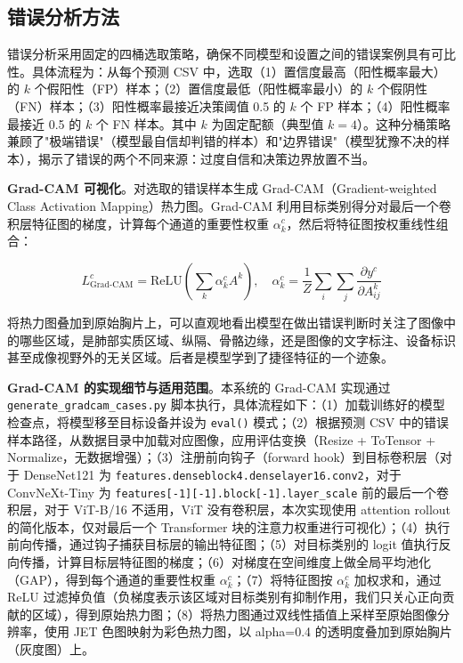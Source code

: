 \documentclass[12pt,a4paper,UTF8,openany]{ctexbook}
\begin{document}
\subsection{错误分析方法}

错误分析采用固定的四桶选取策略，确保不同模型和设置之间的错误案例具有可比性。具体流程为：从每个预测 CSV 中，选取（1）置信度最高（阳性概率最大）的 $k$ 个假阳性（FP）样本；（2）置信度最低（阳性概率最小）的 $k$ 个假阴性（FN）样本；（3）阳性概率最接近决策阈值 0.5 的 $k$ 个 FP 样本；（4）阳性概率最接近 0.5 的 $k$ 个 FN 样本。其中 $k$ 为固定配额（典型值 $k=4$）。这种分桶策略兼顾了"极端错误"（模型最自信却判错的样本）和"边界错误"（模型犹豫不决的样本），揭示了错误的两个不同来源：过度自信和决策边界放置不当。

\textbf{Grad-CAM 可视化}。对选取的错误样本生成 Grad-CAM（Gradient-weighted Class Activation Mapping）热力图。Grad-CAM 利用目标类别得分对最后一个卷积层特征图的梯度，计算每个通道的重要性权重 $\alpha_k^c$，然后将特征图按权重线性组合：

\begin{equation}
L_{\text{Grad-CAM}}^c = \text{ReLU}\left(\sum_k \alpha_k^c A^k\right), \quad
\alpha_k^c = \frac{1}{Z}\sum_i\sum_j \frac{\partial y^c}{\partial A_{ij}^k}
\end{equation}

将热力图叠加到原始胸片上，可以直观地看出模型在做出错误判断时关注了图像中的哪些区域，是肺部实质区域、纵隔、骨骼边缘，还是图像的文字标注、设备标识甚至成像视野外的无关区域。后者是模型学到了捷径特征的一个迹象。

\textbf{Grad-CAM 的实现细节与适用范围}。本系统的 Grad-CAM 实现通过 \texttt{generate\_gradcam\_cases.py} 脚本执行，具体流程如下：（1）加载训练好的模型检查点，将模型移至目标设备并设为 \texttt{eval()} 模式；（2）根据预测 CSV 中的错误样本路径，从数据目录中加载对应图像，应用评估变换（Resize + ToTensor + Normalize，无数据增强）；（3）注册前向钩子（forward hook）到目标卷积层（对于 DenseNet121 为 \texttt{features.denseblock4.denselayer16.conv2}，对于 ConvNeXt-Tiny 为 \texttt{features[-1][-1].block[-1].layer\_scale} 前的最后一个卷积层，对于 ViT-B/16 不适用，ViT 没有卷积层，本次实现使用 attention rollout 的简化版本，仅对最后一个 Transformer 块的注意力权重进行可视化）；（4）执行前向传播，通过钩子捕获目标层的输出特征图；（5）对目标类别的 logit 值执行反向传播，计算目标层特征图的梯度；（6）对梯度在空间维度上做全局平均池化（GAP），得到每个通道的重要性权重 $\alpha_k^c$；（7）将特征图按 $\alpha_k^c$ 加权求和，通过 ReLU 过滤掉负值（负梯度表示该区域对目标类别有抑制作用，我们只关心正向贡献的区域），得到原始热力图；（8）将热力图通过双线性插值上采样至原始图像分辨率，使用 JET 色图映射为彩色热力图，以 alpha=0.4 的透明度叠加到原始胸片（灰度图）上。
\end{document}
